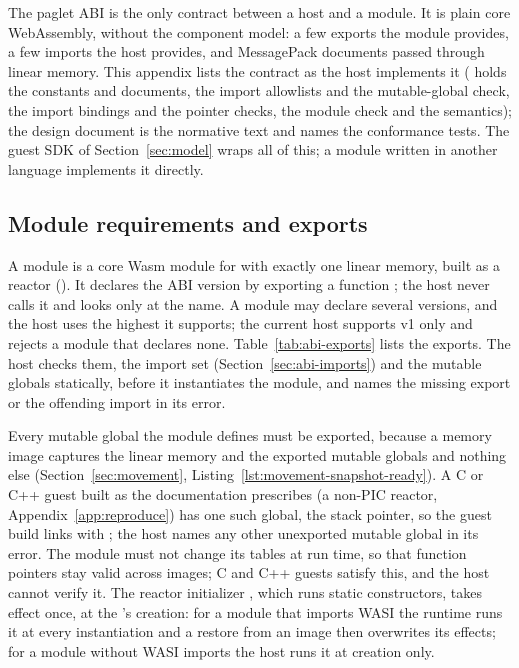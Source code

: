 
\begingroup\setlength{\emergencystretch}{3em}

The paglet ABI is the only contract between a host and a \paglet{} module.
It is plain core WebAssembly, without the component model: a few exports
the module provides, a few imports the host provides, and MessagePack
documents passed through linear memory. This appendix lists the contract as
the host implements it ( holds the
constants and documents,  the import
allowlists and the mutable-global check, 
the import bindings and the pointer checks, 
the module check and the semantics); the design document  is the
normative text and names the conformance tests. The guest SDK of
Section~\ref{sec:model} wraps all of this; a module written in another
language implements it directly.

\subsection{Module requirements and exports}\label{sec:abi-exports}

A module is a core Wasm module for  with exactly one linear
memory, built as a reactor (). It declares the
ABI version by exporting a function ; the host never
calls it and looks only at the name. A module may declare several versions,
and the host uses the highest it supports; the current host supports v1
only and rejects a module that declares none. Table~\ref{tab:abi-exports}
lists the exports. The host checks them, the import set
(Section~\ref{sec:abi-imports}) and the mutable globals statically, before
it instantiates the module, and names the missing export or the offending
import in its error.

Every mutable global the module defines must be exported, because a memory
image captures the linear memory and the exported mutable globals and
nothing else (Section~\ref{sec:movement},
Listing~\ref{lst:movement-snapshot-ready}). A C or C++ guest built as
the documentation prescribes (a non-PIC reactor,
Appendix~\ref{app:reproduce}) has one such global, the stack pointer, so
the guest build links with ; the host
names any other unexported mutable global in its error. The module must
not change its tables at run time, so that function pointers stay valid
across images; C and C++ guests satisfy this, and the host cannot verify
it. The reactor initializer , which runs static
constructors, takes effect once, at the \paglet{}'s creation: for a module
that imports WASI the runtime runs it at every instantiation and a restore
from an image then overwrites its effects; for a module without WASI
imports the host runs it at creation only.

